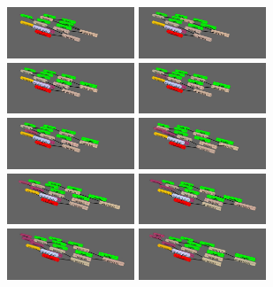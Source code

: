 \documentclass[11pt]{article}
\begin{document}
\begin{figure}
\begin{center}
\includegraphics[width=1.5in]{figures/bar-010.png}
\includegraphics[width=1.5in]{figures/bar-012.png}
\includegraphics[width=1.5in]{figures/bar-014.png}
\includegraphics[width=1.5in]{figures/bar-016.png}
\includegraphics[width=1.5in]{figures/bar-018.png}
\includegraphics[width=1.5in]{figures/bar-022.png}
\includegraphics[width=1.5in]{figures/bar-024.png}
\includegraphics[width=1.5in]{figures/bar-026.png}
\includegraphics[width=1.5in]{figures/bar-028.png}
\includegraphics[width=1.5in]{figures/bar-030.png}

\end{center}
\end{figure}
\end{document}
